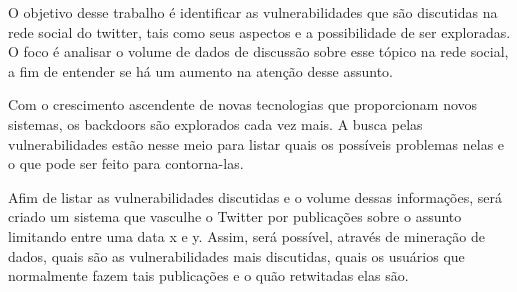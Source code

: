 O objetivo desse trabalho é identificar as vulnerabilidades que são discutidas na rede social do twitter, tais como seus aspectos e a possibilidade de ser exploradas. O foco é analisar o volume de dados de discussão sobre esse tópico na rede social, a fim de entender se há um aumento na atenção desse assunto.

Com o crescimento ascendente de novas tecnologias que proporcionam novos sistemas, os backdoors são explorados cada vez mais. A busca pelas vulnerabilidades estão nesse meio para listar quais os possíveis problemas nelas e o que pode ser feito para contorna-las.

Afim de listar as vulnerabilidades discutidas e o volume dessas informações, será criado um sistema que vasculhe o Twitter por publicações sobre o assunto limitando entre uma data x e y. Assim, será possível, através de mineração de dados, quais são as vulnerabilidades mais discutidas, quais os usuários que normalmente fazem tais publicações e o quão retwitadas elas são.




